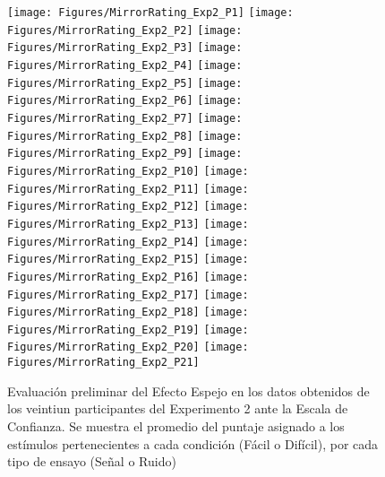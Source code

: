 \begin{figure}[th]
\centering
\texttt{[image: Figures/MirrorRating\_Exp2\_P1]} \texttt{[image: Figures/MirrorRating\_Exp2\_P2]} \texttt{[image: Figures/MirrorRating\_Exp2\_P3]}
\texttt{[image: Figures/MirrorRating\_Exp2\_P4]} \texttt{[image: Figures/MirrorRating\_Exp2\_P5]} \texttt{[image: Figures/MirrorRating\_Exp2\_P6]}
\texttt{[image: Figures/MirrorRating\_Exp2\_P7]} \texttt{[image: Figures/MirrorRating\_Exp2\_P8]} \texttt{[image: Figures/MirrorRating\_Exp2\_P9]}
\texttt{[image: Figures/MirrorRating\_Exp2\_P10]} \texttt{[image: Figures/MirrorRating\_Exp2\_P11]} \texttt{[image: Figures/MirrorRating\_Exp2\_P12]}
\texttt{[image: Figures/MirrorRating\_Exp2\_P13]} \texttt{[image: Figures/MirrorRating\_Exp2\_P14]} \texttt{[image: Figures/MirrorRating\_Exp2\_P15]}
\texttt{[image: Figures/MirrorRating\_Exp2\_P16]} \texttt{[image: Figures/MirrorRating\_Exp2\_P17]} \texttt{[image: Figures/MirrorRating\_Exp2\_P18]}
\texttt{[image: Figures/MirrorRating\_Exp2\_P19]} \texttt{[image: Figures/MirrorRating\_Exp2\_P20]} \texttt{[image: Figures/MirrorRating\_Exp2\_P21]} 
\caption[Puntaje de confianza promedio por tipo de estímulo (A-B) y tipo de ensayo (S-N); Experimento 2]{Evaluación preliminar del Efecto Espejo en los datos obtenidos de los veintiun participantes del Experimento 2 ante la Escala de Confianza. Se muestra el promedio del puntaje asignado a los estímulos pertenecientes a cada condición (Fácil o Difícil), por cada tipo de ensayo (Señal o Ruido)}
\label{fig:MERating_E2}
\end{figure}




